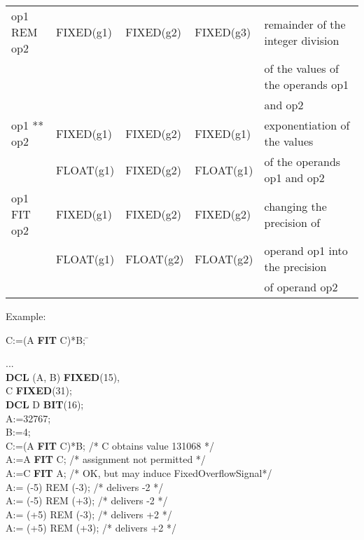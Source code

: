 \begin{table}
\begin{center}
\begin{tabular}{|l|l|l|l|l|}
op1 REM op2      & FIXED(g1)       & FIXED(g2)       & FIXED(g3)         & remainder of the integer division\\
                 &                 &                 &                   & of the values of the operands op1\\
                 &                 &                 &                   & and op2\\ \hline

op1 ** op2       & FIXED(g1)       & FIXED(g2)       & FIXED(g1)         & exponentiation of the values\\
                 & FLOAT(g1)       & FIXED(g2)       & FLOAT(g1)         & of the operands op1 and op2\\ \hline

op1 FIT op2      & FIXED(g1)       & FIXED(g2)       & FIXED(g2)         & changing the precision of\\
                 & FLOAT(g1)       & FLOAT(g2)       & FLOAT(g2)         & operand op1 into the precision\\
                 &                 &                 &                   & of operand op2\\  
\hline
\end{tabular}
\end{center}
\end{table}

Example:

\begin{tabbing}
C:=(A {\bf FIT} C)*B; \x \x \= \kill

... \> \\
{\bf DCL} (A, B) {\bf FIXED}(15), \> \\
\x        C {\bf FIXED}(31);      \> \\
{\bf DCL} D {\bf BIT}(16);        \> \\
A:=32767;                         \> \\
B:=4;                             \> \\
C:=(A {\bf FIT} C)*B;    \> /* C obtains value 131068 */ \\
A:=A {\bf FIT} C;        \> /* assignment not permitted */ \\
A:=C {\bf FIT} A;        \> /* OK, but may induce FixedOverflowSignal*/ \\
A:= (-5) REM (-3);	 \> /* delivers -2 */ \\
A:= (-5) REM (+3);	 \> /* delivers -2 */ \\
A:= (+5) REM (-3);	 \> /* delivers +2 */ \\
A:= (+5) REM (+3);	 \> /* delivers +2 */ \\
\end{tabbing}


